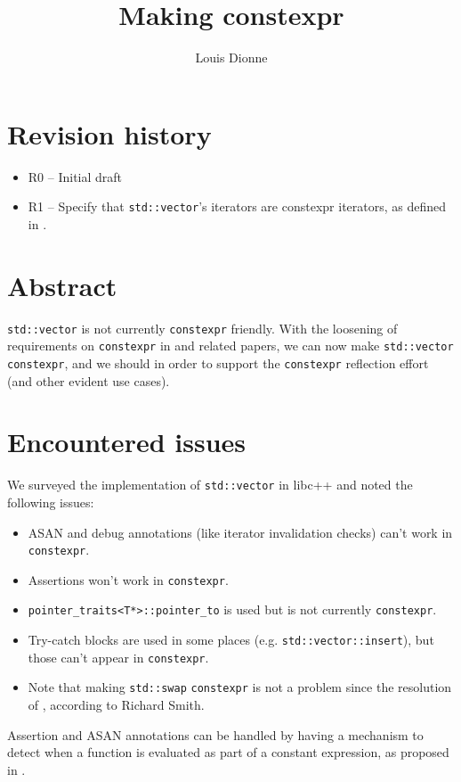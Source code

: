 \documentclass{wg21}
\title{Making \cc{std::vector} constexpr}
\author{Louis Dionne}{ldionne.2@gmail.com}
\newcommand{\cc}[1]{\texttt{#1}}
\begin{document}
\maketitle

\section{Revision history}
\begin{itemize}
  \item R0 -- Initial draft
  \item R1 -- Specify that \cc{std::vector}'s iterators are constexpr iterators,
              as defined in \cite{P0858R0}.
\end{itemize}


\section{Abstract}
\cc{std::vector} is not currently \cc{constexpr} friendly. With the loosening
of requirements on \cc{constexpr} in \cite{P0784R1} and related papers, we
can now make \cc{std::vector} \cc{constexpr}, and we should in order to support
the \cc{constexpr} reflection effort (and other evident use cases).


\section{Encountered issues}
We surveyed the implementation of \cc{std::vector} in libc++ and noted the
following issues:
\begin{itemize}
  \item ASAN and debug annotations (like iterator invalidation checks) can't
        work in \cc{constexpr}.
  \item Assertions won't work in \cc{constexpr}.
  \item \cc{pointer_traits<T*>::pointer_to} is used but is not currently
        \cc{constexpr}.
  \item Try-catch blocks are used in some places (e.g. \cc{std::vector::insert}),
        but those can't appear in \cc{constexpr}.
  \item Note that making \cc{std::swap} \cc{constexpr} is not a problem since
        the resolution of \cite{P0859R0}, according to Richard Smith.
\end{itemize}

Assertion and ASAN annotations can be handled by having a mechanism to detect
when a function is evaluated as part of a constant expression, as proposed in
\cite{P0595R0}.
\end{document}

